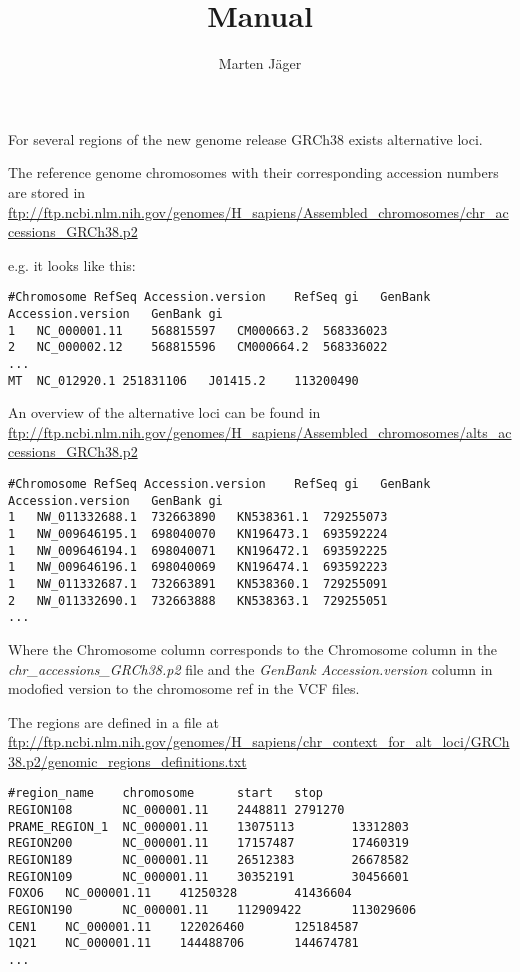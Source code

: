 \documentclass[10pt,a4paper]{article}
\author{Marten Jäger}
\title{Manual}
\begin{document}
\maketitle

For several regions of the new genome release GRCh38 exists alternative loci.

The reference genome chromosomes with their corresponding accession numbers are
stored in \\

\url{ftp://ftp.ncbi.nlm.nih.gov/genomes/H_sapiens/Assembled_chromosomes/chr_accessions_GRCh38.p2}

e.g. it looks like this:
\begin{verbatim}
#Chromosome	RefSeq Accession.version	RefSeq gi	GenBank Accession.version	GenBank gi
1	NC_000001.11	568815597	CM000663.2	568336023
2	NC_000002.12	568815596	CM000664.2	568336022
...
MT	NC_012920.1	251831106	J01415.2	113200490
\end{verbatim}

An overview of the alternative loci can be found in \\

\url{ftp://ftp.ncbi.nlm.nih.gov/genomes/H_sapiens/Assembled_chromosomes/alts_accessions_GRCh38.p2}

\begin{verbatim}
#Chromosome	RefSeq Accession.version	RefSeq gi	GenBank Accession.version	GenBank gi
1	NW_011332688.1	732663890	KN538361.1	729255073
1	NW_009646195.1	698040070	KN196473.1	693592224
1	NW_009646194.1	698040071	KN196472.1	693592225
1	NW_009646196.1	698040069	KN196474.1	693592223
1	NW_011332687.1	732663891	KN538360.1	729255091
2	NW_011332690.1	732663888	KN538363.1	729255051
...
\end{verbatim}

Where the Chromosome column corresponds to the Chromosome column in the
\textit{chr\_accessions\_GRCh38.p2} file and the \textit{GenBank
Accession.version} column in modofied version to the chromosome ref in the VCF
files.


The regions are defined in a file at \\
\url{ftp://ftp.ncbi.nlm.nih.gov/genomes/H\_sapiens/chr\_context\_for\_alt\_loci/GRCh38.p2/genomic\_regions\_definitions.txt}


\begin{verbatim}
#region_name    chromosome      start   stop
REGION108       NC_000001.11    2448811 2791270
PRAME_REGION_1  NC_000001.11    13075113        13312803
REGION200       NC_000001.11    17157487        17460319
REGION189       NC_000001.11    26512383        26678582
REGION109       NC_000001.11    30352191        30456601
FOXO6   NC_000001.11    41250328        41436604
REGION190       NC_000001.11    112909422       113029606
CEN1    NC_000001.11    122026460       125184587
1Q21    NC_000001.11    144488706       144674781
...
\end{verbatim}
\end{document}

